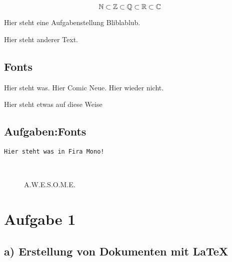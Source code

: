 \documentclass{uebungsblatt}
\begin{document}
\[\mathbb{N} \subset \mathbb{Z} \subset \mathbb{Q} \subset \mathbb{R} \subset \mathbb{C}\]

Hier steht eine Aufgabenstellung Bliblablub.

\begin{loesung}
    \lipsum[5]
\end{loesung}

\noindent
Hier steht anderer Text. \lipsum[2]


\subsection*{Fonts}


Hier steht was.
{\selectfont Hier Comic Neue.}
Hier wieder nicht.

{\noindent\comicneue Hier steht etwas auf diese Weise} \\


\subsection*{Aufgaben:\quad Fonts}

\texttt{Hier steht was in Fira Mono!}

\begin{figure}[h!]
    \centering
    {\Huge \faAd\ \faWikipediaW\ \faEnvelopeOpen[regular]\ \faSleigh\ \faOtter\ \faMicroscope\ \faEyeDropper}
    \caption{A.W.E.S.O.M.E.}
\end{figure}





\newpage




\section*{Aufgabe 1}
\subsection*{a) Erstellung von Dokumenten mit LaTeX}
\end{document}
